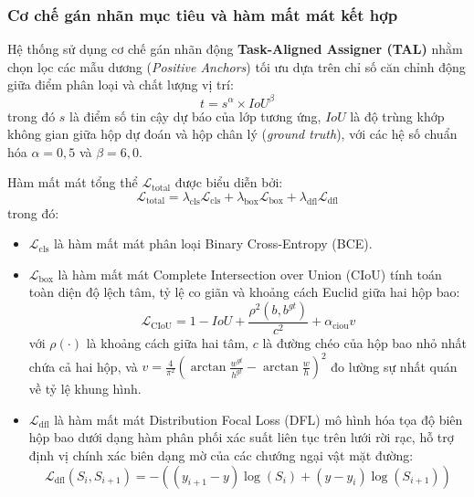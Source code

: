 \documentclass[12pt,a4paper]{article}
\begin{document}
\subsubsection{Cơ chế gán nhãn mục tiêu và hàm mất mát kết hợp}
Hệ thống sử dụng cơ chế gán nhãn động \textbf{Task-Aligned Assigner (TAL)} nhằm chọn lọc các mẫu dương (\textit{Positive Anchors}) tối ưu dựa trên chỉ số căn chỉnh động giữa điểm phân loại và chất lượng vị trí:
\begin{equation}
\label{eq:task_aligned_metric}
t = s^\alpha \times IoU^\beta
\end{equation}
trong đó $s$ là điểm số tin cậy dự báo của lớp tương ứng, $IoU$ là độ trùng khớp không gian giữa hộp dự đoán và hộp chân lý (\textit{ground truth}), với các hệ số chuẩn hóa $\alpha = 0,5$ và $\beta = 6,0$.

Hàm mất mát tổng thể $\mathcal{L}_{\text{total}}$ được biểu diễn bởi:
\begin{equation}
\label{eq:total_loss}
\mathcal{L}_{\text{total}} = \lambda_{\text{cls}} \mathcal{L}_{\text{cls}} + \lambda_{\text{box}} \mathcal{L}_{\text{box}} + \lambda_{\text{dfl}} \mathcal{L}_{\text{dfl}}
\end{equation}
trong đó:
\begin{itemize}
    \item $\mathcal{L}_{\text{cls}}$ là hàm mất mát phân loại Binary Cross-Entropy (BCE).
    \item $\mathcal{L}_{\text{box}}$ là hàm mất mát Complete Intersection over Union (CIoU) tính toán toàn diện độ lệch tâm, tỷ lệ co giãn và khoảng cách Euclid giữa hai hộp bao:
    \begin{equation}
    \label{eq:ciou_loss}
    \mathcal{L}_{\text{CIoU}} = 1 - IoU + \frac{\rho^2(b, b^{gt})}{c^2} + \alpha_{\text{ciou}} v
    \end{equation}
    với $\rho(\cdot)$ là khoảng cách giữa hai tâm, $c$ là đường chéo của hộp bao nhỏ nhất chứa cả hai hộp, và $v = \frac{4}{\pi^2} \left( \arctan\frac{w^{gt}}{h^{gt}} - \arctan\frac{w}{h} \right)^2$ đo lường sự nhất quán về tỷ lệ khung hình.
    \item $\mathcal{L}_{\text{dfl}}$ là hàm mất mát Distribution Focal Loss (DFL) mô hình hóa tọa độ biên hộp bao dưới dạng hàm phân phối xác suất liên tục trên lưới rời rạc, hỗ trợ định vị chính xác biên dạng mờ của các chướng ngại vật mặt đường:
    \begin{equation}
    \label{eq:dfl_loss}
    \mathcal{L}_{\text{dfl}}(S_i, S_{i+1}) = - \left( (y_{i+1} - y)\log(S_i) + (y - y_i)\log(S_{i+1}) \right)
    \end{equation}
\end{itemize}
\end{document}
